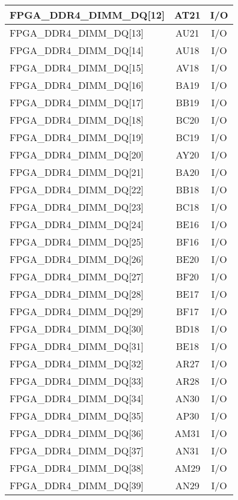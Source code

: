 \begin{longtable}[l]{| l | c | c |}
  FPGA\_DDR4\_DIMM\_DQ[12]     & AT21 & I/O \\ \hline
  FPGA\_DDR4\_DIMM\_DQ[13]     & AU21 & I/O \\ \hline
  FPGA\_DDR4\_DIMM\_DQ[14]     & AU18 & I/O \\ \hline
  FPGA\_DDR4\_DIMM\_DQ[15]     & AV18 & I/O \\ \hline
  FPGA\_DDR4\_DIMM\_DQ[16]     & BA19 & I/O \\ \hline
  FPGA\_DDR4\_DIMM\_DQ[17]     & BB19 & I/O \\ \hline
  FPGA\_DDR4\_DIMM\_DQ[18]     & BC20 & I/O \\ \hline
  FPGA\_DDR4\_DIMM\_DQ[19]     & BC19 & I/O \\ \hline
  FPGA\_DDR4\_DIMM\_DQ[20]     & AY20 & I/O \\ \hline
  FPGA\_DDR4\_DIMM\_DQ[21]     & BA20 & I/O \\ \hline
  FPGA\_DDR4\_DIMM\_DQ[22]     & BB18 & I/O \\ \hline
  FPGA\_DDR4\_DIMM\_DQ[23]     & BC18 & I/O \\ \hline
  FPGA\_DDR4\_DIMM\_DQ[24]     & BE16 & I/O \\ \hline
  FPGA\_DDR4\_DIMM\_DQ[25]     & BF16 & I/O \\ \hline
  FPGA\_DDR4\_DIMM\_DQ[26]     & BE20 & I/O \\ \hline
  FPGA\_DDR4\_DIMM\_DQ[27]     & BF20 & I/O \\ \hline
  FPGA\_DDR4\_DIMM\_DQ[28]     & BE17 & I/O \\ \hline
  FPGA\_DDR4\_DIMM\_DQ[29]     & BF17 & I/O \\ \hline
  FPGA\_DDR4\_DIMM\_DQ[30]     & BD18 & I/O \\ \hline
  FPGA\_DDR4\_DIMM\_DQ[31]     & BE18 & I/O \\ \hline
  FPGA\_DDR4\_DIMM\_DQ[32]     & AR27 & I/O \\ \hline
  FPGA\_DDR4\_DIMM\_DQ[33]     & AR28 & I/O \\ \hline
  FPGA\_DDR4\_DIMM\_DQ[34]     & AN30 & I/O \\ \hline
  FPGA\_DDR4\_DIMM\_DQ[35]     & AP30 & I/O \\ \hline
  FPGA\_DDR4\_DIMM\_DQ[36]     & AM31 & I/O \\ \hline
  FPGA\_DDR4\_DIMM\_DQ[37]     & AN31 & I/O \\ \hline
  FPGA\_DDR4\_DIMM\_DQ[38]     & AM29 & I/O \\ \hline
  FPGA\_DDR4\_DIMM\_DQ[39]     & AN29 & I/O \\ \hline

\end{longtable}
